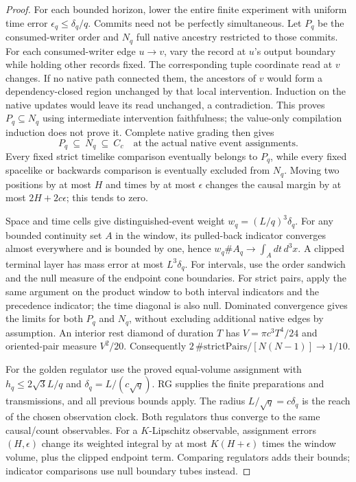 \begin{proof}
For each bounded horizon, lower the entire finite experiment with uniform
time error $\epsilon_q\leq\delta_q/q$. Commits need not be perfectly
simultaneous. Let $P_q$ be the consumed-writer order and $N_q$ full native
ancestry restricted to those commits. For each consumed-writer edge $u\to v$,
vary the record at $u$'s output boundary while holding other records fixed.
The corresponding tuple coordinate read at $v$ changes. If no native path
connected them, the ancestors of $v$ would form a dependency-closed region
unchanged by that local intervention. Induction on the native updates would
leave its read unchanged, a contradiction. This proves $P_q\subseteq N_q$
using intermediate intervention faithfulness; the value-only compilation
induction does not prove it. Complete native grading then gives
\[
 P_q\ \subseteq\ N_q\ \subseteq\ C_c
 \quad\text{at the actual native event assignments.}
\]
Every fixed strict timelike comparison eventually belongs to $P_q$, while
every fixed spacelike or backwards comparison is eventually excluded from
$N_q$. Moving two positions by at most $H$ and times by at most $\epsilon$
changes the causal margin by at most $2H+2c\epsilon$; this tends to zero.

Space and time cells give distinguished-event weight
$w_q=(L/q)^3\delta_q$. For any bounded continuity set $A$ in the window,
its pulled-back indicator converges almost everywhere and is bounded by
one, hence $w_q\#A_q\to\int_A dt\,d^3x$. A clipped terminal layer has
mass error at most $L^3\delta_q$. For intervals, use the order sandwich
and the null measure of the endpoint cone boundaries. For strict pairs,
apply the same argument on the product window to both interval indicators
and the precedence indicator; the time diagonal is also null. Dominated
convergence gives the limits for both $P_q$ and $N_q$, without excluding
additional native edges by assumption. An interior rest diamond of duration
$T$ has $V=\pi c^3T^4/24$ and oriented-pair measure $V^2/20$.
Consequently $2\,\#\mathrm{strictPairs}/[N(N-1)]\to1/10$.

For the golden regulator use the proved equal-volume assignment
with $h_q\leq2\sqrt3L/q$ and $\delta_q=L/(c\sqrt q)$. RG supplies
the finite preparations and transmissions, and all previous bounds apply.
The radius $L/\sqrt q=c\delta_q$ is the reach of the chosen observation
clock. Both regulators thus converge to the same causal/count observables.
For a $K$-Lipschitz observable, assignment errors $(H,\epsilon)$ change
its weighted integral by at most $K(H+\epsilon)$ times the window volume,
plus the clipped endpoint term. Comparing regulators adds their bounds;
indicator comparisons use null boundary tubes instead.
\end{proof}

